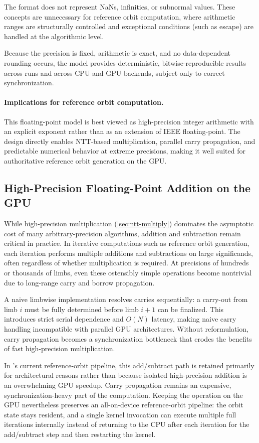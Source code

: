 The format does not represent NaNs, infinities, or subnormal values. These
concepts are unnecessary for reference orbit computation, where arithmetic
ranges are structurally controlled and exceptional conditions (such as escape)
are handled at the algorithmic level.

Because the precision is fixed, arithmetic is exact, and no data-dependent
rounding occurs, the  model provides deterministic,
bitwise-reproducible results across runs and across CPU and GPU backends,
subject only to correct synchronization.

\paragraph{Implications for reference orbit computation.}
This floating-point model is best viewed as high-precision integer arithmetic
with an explicit exponent rather than as an extension of IEEE floating-point.
The design directly enables NTT-based multiplication, parallel carry
propagation, and predictable numerical behavior at extreme precisions, making
it well suited for authoritative reference orbit generation on the GPU.

\subsection{High-Precision Floating-Point Addition on the GPU}
\label{sec:hp-add}

While high-precision multiplication (\cref{sec:ntt-multiply}) dominates the asymptotic cost of many
arbitrary-precision algorithms, addition and subtraction remain critical in
practice. In iterative computations such as reference orbit generation, each
iteration performs multiple additions and subtractions on large significands,
often regardless of whether multiplication is required. At precisions of
hundreds or thousands of limbs, even these ostensibly simple operations become
nontrivial due to long-range carry and borrow propagation.

A naive limbwise implementation resolves carries sequentially: a carry-out from
limb $i$ must be fully determined before limb $i+1$ can be finalized. This
introduces strict serial dependence and $O(N)$ latency, making naive carry
handling incompatible with parallel GPU architectures.
Without reformulation, carry propagation becomes a synchronization
bottleneck that erodes the benefits of fast high-precision multiplication.

In \FractalShark{}'s current reference-orbit pipeline, this add/subtract path
is retained primarily for architectural reasons rather than because isolated
high-precision addition is an overwhelming GPU speedup. Carry propagation
remains an expensive, synchronization-heavy part of the computation. Keeping
the operation on the GPU nevertheless preserves an all-on-device reference-orbit
pipeline: the orbit state stays resident, and a single kernel invocation can
execute multiple full iterations internally instead of returning to the CPU
after each iteration for the add/subtract step and then restarting the kernel.

